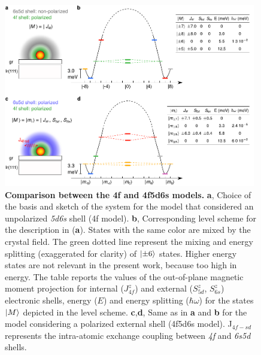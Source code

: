 \documentclass[
reprint,amsmath,amssymb,aps]{revtex4-2}
\begin{document}
\begin{figure}[ht!]
\includegraphics[width=0.98\textwidth]{Fig1_new.pdf}
\caption{\textbf{Comparison between the 4f and 4f5d6s models.} \textbf{a}, Choice of the basis and sketch of the system for the model that considered an unpolarized \textit{5d6s} shell (4f model). \textbf{b}, Corresponding level scheme for the description in (\textbf{a}). States with the same color are mixed by the crystal field. The green dotted line represent the mixing and energy splitting (exaggerated for clarity) of $\ket{\pm6}$ states. Higher energy states are not relevant in the present work, because too high in energy.  The table reports the values of the out-of-plane magnetic moment projection for internal ($J_{4f}^z$) and external ($S^z_{5d}$, $S^z_{6s}$)  electronic shells, energy ($E$) and energy splitting ($\hbar\omega$) for the states $\ket{M}$ depicted in the level scheme. \textbf{c},\textbf{d}, Same as in \textbf{a} and \textbf{b} for the model considering a polarized external shell (4f5d6s model). J$_{4f-sd}$ represents the intra-atomic exchange coupling between \textit{4f} and \textit{6s5d} shells.
\label{fig:intra} }
\end{figure}
\end{document}
